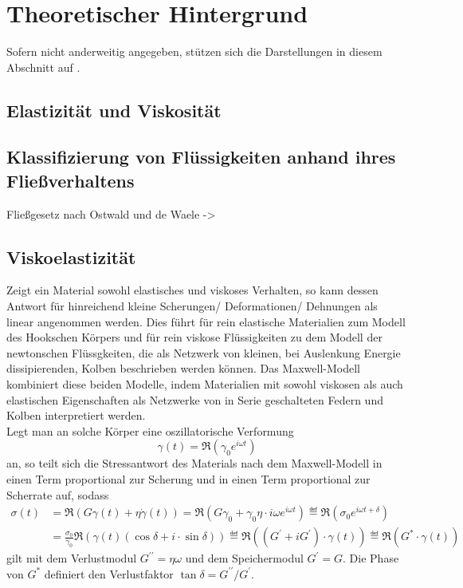 \documentclass[11pt,a4paper,oneside]{scrartcl}
\begin{document}
\section{Theoretischer Hintergrund}
Sofern nicht anderweitig angegeben, stützen sich die Darstellungen in diesem Abschnitt auf \cite{versuchsanleitung}.
\subsection{Elastizität und Viskosität}
\subsection{Klassifizierung von Flüssigkeiten anhand ihres Fließverhaltens}
Fließgesetz nach Ostwald und de Waele ->\cite{dewiki:192899581}
\subsection{Viskoelastizität}
Zeigt ein Material sowohl elastisches und viskoses Verhalten, so kann dessen Antwort für hinreichend kleine Scherungen/ Deformationen/ Dehnungen als linear angenommen werden. Dies führt für rein elastische Materialien zum Modell des Hookschen Körpers und für rein viskose Flüssigkeiten zu dem Modell der newtonschen Flüssgkeiten, die als Netzwerk von kleinen, bei Auslenkung Energie dissipierenden, Kolben beschrieben werden können. Das Maxwell-Modell kombiniert diese beiden Modelle, indem Materialien mit sowohl viskosen als auch elastischen Eigenschaften als Netzwerke von in  Serie geschalteten Federn und Kolben interpretiert werden.\\
Legt man an solche Körper eine oszillatorische Verformung 
\begin{equation}
\gamma(t)=\Re\left(\gamma_0 e^{i\omega t}\right)
\end{equation}
an, so teilt sich die Stressantwort des Materials nach dem Maxwell-Modell in einen Term proportional zur Scherung und in einen Term proportional zur Scherrate auf, sodass
\begin{align}
\sigma(t)&=\Re\left(G\gamma(t)+\eta\dot\gamma(t)\right)=\Re\left(G\gamma_0+\gamma_0\eta\cdot i\omega  e^{i\omega t}\right)\eqdef \Re\left(\sigma_0 e^{i\omega t+\delta} \right)\\
\quad& =\frac{\sigma_0}{\gamma_0}\Re\left(\gamma(t)(\cos\delta+i\cdot\sin\delta)\right)\eqdef\Re\left( (G^\prime+iG^\prime)\cdot\gamma(t)\right)\eqdef \Re\left(G^*\cdot\gamma(t)\right)
\end{align}
gilt mit dem Verlustmodul $G^{\prime\prime}=\eta\omega$ und dem Speichermodul $G^\prime=G$. Die Phase von $G^*$ definiert den Verlustfaktor $\tan\delta = G^{\prime\prime}/G^{\prime}$.\\
\end{document}
